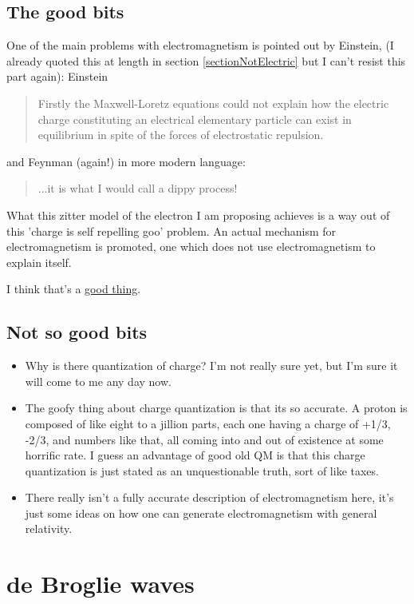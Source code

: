 \documentclass[../rzero]{subfiles}
\begin{document}
\subsection{The good bits}
One of the main problems with electromagnetism is pointed out by Einstein, (I already quoted this at length in section \ref{sectionNotElectric} but I can't resist this part again): Einstein\cite{Einstein1920}
\begin{quotation}
	Firstly the Maxwell-Loretz equations could not explain how the electric charge constituting an electrical elementary particle can exist in equilibrium in spite of the forces of electrostatic repulsion.  
\end{quotation}

and Feynman\cite{Feynman1985} (again!) in more modern language: 
\begin{quotation}
...it is what I would call a dippy process! 
\end{quotation}

What this zitter model of the electron I am proposing achieves is a way out of this 'charge is self repelling goo' problem. An actual mechanism for electromagnetism is promoted, one which does not use electromagnetism to explain itself. 

I think that's a \href{https://tenor.com/view/martha-stewart-toast-good-thing-gif-4272733}{good thing}. 

\subsection{Not so good bits}
\begin{itemize}
	\item{Why is there quantization of charge? I'm not really sure yet, but I'm sure it will come to me any day now.} 
	\item{The goofy thing about charge quantization is that its so accurate. A proton is composed of like eight to a jillion parts, each one having a charge of +1/3, -2/3, and numbers like that, all coming into and out of existence at some horrific rate. I guess an advantage of good old QM is that this charge quantization is just stated as an unquestionable truth, sort of like taxes.}
	\item{There really isn't a fully accurate description of electromagnetism here, it's just some ideas on how one can generate electromagnetism with general relativity.}
\end{itemize}


\section{de Broglie waves}
\end{document}
